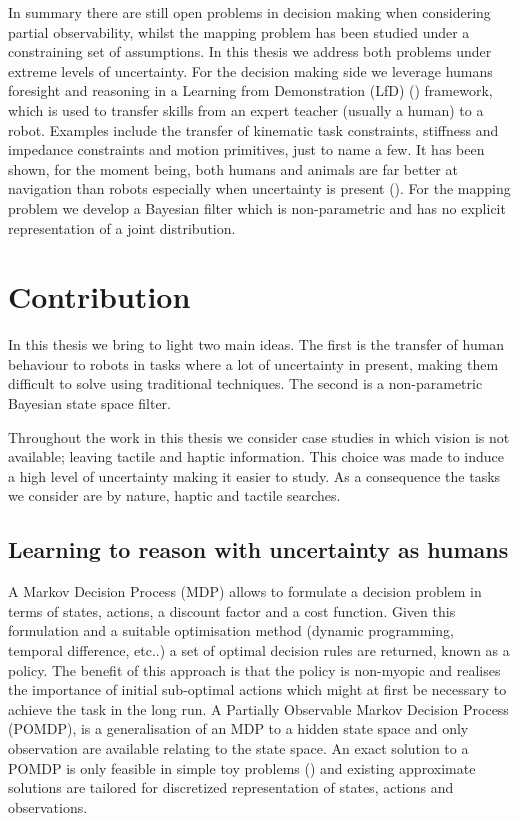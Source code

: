 In summary there are still open problems in decision making when considering partial observability, whilst 
the mapping problem has been studied under a constraining set of assumptions. In this thesis we address both problems 
under extreme levels of uncertainty. 
For the decision making side we leverage humans foresight and reasoning in a Learning from Demonstration (LfD) (\cite{Billard08chapter})
framework, which is used to transfer skills from an expert teacher (usually a human) to a robot. Examples include the transfer of 
kinematic task constraints, stiffness and impedance constraints and motion primitives, just to name a few.
It has been shown, for the moment being, both humans and animals are far better at navigation than robots especially when 
uncertainty is present (\cite{stankiewicz2006lost}). For the mapping problem we develop a Bayesian filter which is non-parametric 
and has no explicit representation of a joint distribution.


\section{Contribution}

In this thesis we bring to light two main ideas. The first is the transfer of human behaviour to robots
in tasks where a lot of uncertainty in present, making them difficult to solve using traditional techniques.
The second is a non-parametric Bayesian state space filter.

Throughout the work in this thesis we consider case studies in which vision is not available; leaving tactile and 
haptic information. This choice was made to induce a high level of uncertainty making it easier to study. As 
a consequence the tasks we consider are by nature, haptic and tactile searches.

\subsection{Learning to reason with uncertainty as humans}

A Markov Decision Process (MDP) allows to formulate a decision problem in terms of states, actions, a discount factor 
and a cost function. Given this formulation and a suitable optimisation method (dynamic programming, temporal difference, etc..) 
a set of optimal decision rules are returned, known as a policy. The benefit of this approach 
is that the policy is non-myopic and realises the importance of initial sub-optimal actions which might at first 
be necessary to achieve the task in the long run. A Partially Observable Markov Decision Process (POMDP), is 
a generalisation of an MDP to a hidden state space and only observation are available relating 
to the state space. An exact solution to a POMDP is only feasible in simple toy problems 
(\cite{Thrun_Burgard_Fox_2005}) and existing approximate solutions are tailored for discretized 
representation of states, actions and observations.

